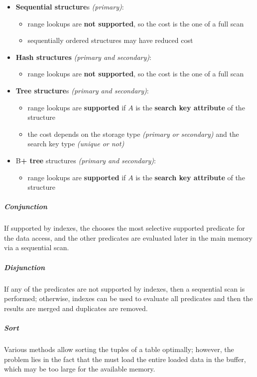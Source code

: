 \documentclass[english]{article}
\begin{document}
\begin{itemize}
  \item \textbf{Sequential structure}s \textit{(primary)}:
        \begin{itemize}[label=\xmarkthin]
          \item range lookups are \textbf{not supported}, so the cost is the one of a full scan
          \item sequentially ordered structures may have reduced cost
        \end{itemize}
  \item \textbf{Hash structures} \textit{(primary and secondary)}:
        \begin{itemize}[label=\xmarkthin]
          \item range lookups are \textbf{not supported}, so the cost is the one of a full scan
        \end{itemize}
  \item \textbf{Tree structure}s \textit{(primary and secondary)}:
        \begin{itemize}[label=\cmarkthin]
          \item range lookups are \textbf{supported} if \(A\) is the \textbf{search key attribute} of the structure
          \item the cost depends on the storage type \textit{(primary or secondary)} and the search key type \textit{(unique or not)}
        \end{itemize}
  \item B\textbf{+ tree} structures \textit{(primary and secondary)}:
        \begin{itemize}[label=\cmarkthin]
          \item range lookups are \textbf{supported} if \(A\) is the \textbf{search key attribute} of the structure
        \end{itemize}
\end{itemize}

\subparagraph*{Conjunction}
If supported by indexes, the \dbms chooses the most selective supported predicate for the data access, and the other predicates are evaluated later in the main memory via a sequential scan.

\subparagraph*{Disjunction}
If any of the predicates are not supported by indexes, then a sequential scan is performed;
otherwise, indexes can be used to evaluate all predicates and then the results are merged and duplicates are removed.

\subparagraph*{Sort}
Various methods allow sorting the tuples of a table optimally;
however, the problem lies in the fact that the \dbms must load the entire loaded data in the buffer, which may be too large for the available memory.
\end{document}
